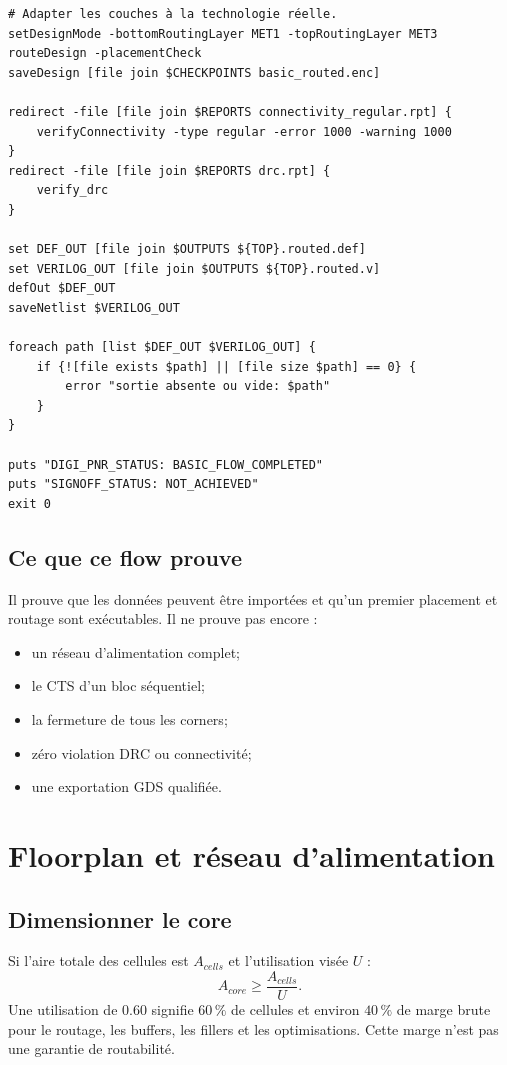 \documentclass[11pt,a4paper,openany]{report}
\begin{document}
\begin{lstlisting}[style=guidecode,language=TclGuide,
caption={innovus\_minimal.tcl}]
# Adapter les couches à la technologie réelle.
setDesignMode -bottomRoutingLayer MET1 -topRoutingLayer MET3
routeDesign -placementCheck
saveDesign [file join $CHECKPOINTS basic_routed.enc]

redirect -file [file join $REPORTS connectivity_regular.rpt] {
    verifyConnectivity -type regular -error 1000 -warning 1000
}
redirect -file [file join $REPORTS drc.rpt] {
    verify_drc
}

set DEF_OUT [file join $OUTPUTS ${TOP}.routed.def]
set VERILOG_OUT [file join $OUTPUTS ${TOP}.routed.v]
defOut $DEF_OUT
saveNetlist $VERILOG_OUT

foreach path [list $DEF_OUT $VERILOG_OUT] {
    if {![file exists $path] || [file size $path] == 0} {
        error "sortie absente ou vide: $path"
    }
}

puts "DIGI_PNR_STATUS: BASIC_FLOW_COMPLETED"
puts "SIGNOFF_STATUS: NOT_ACHIEVED"
exit 0
\end{lstlisting}

\section{Ce que ce flow prouve}

Il prouve que les données peuvent être importées et qu'un premier placement et
routage sont exécutables. Il ne prouve pas encore :

\begin{itemize}
  \item un réseau d'alimentation complet;
  \item le CTS d'un bloc séquentiel;
  \item la fermeture de tous les corners;
  \item zéro violation DRC ou connectivité;
  \item une exportation GDS qualifiée.
\end{itemize}

\chapter{Floorplan et réseau d'alimentation}

\section{Dimensionner le core}

Si l'aire totale des cellules est $A_{cells}$ et l'utilisation visée $U$ :
\[
  A_{core} \geq \frac{A_{cells}}{U}.
\]
Une utilisation de \(0.60\) signifie \(60\,\%\) de cellules et environ
\(40\,\%\) de marge brute pour le routage, les buffers, les fillers et les
optimisations. Cette marge n'est pas une garantie de routabilité.
\end{document}
